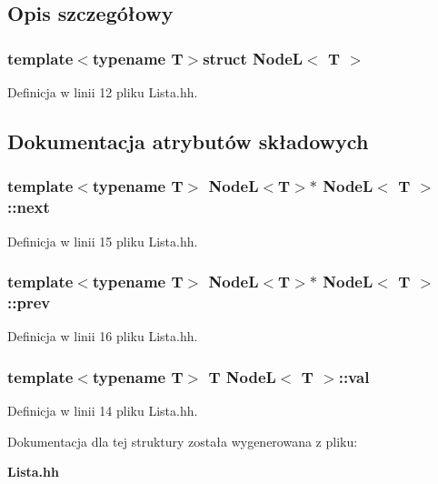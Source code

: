 \subsection{Opis szczegółowy}
\subsubsection*{template$<$typename T$>$struct Node\-L$<$ T $>$}



Definicja w linii 12 pliku Lista.\-hh.



\subsection{Dokumentacja atrybutów składowych}
\subsubsection[{next}]{\setlength{\rightskip}{0pt plus 5cm}template$<$typename T$>$ {\bf Node\-L}$<$T$>$$\ast$ {\bf Node\-L}$<$ T $>$\-::next}\label{struct_node_l_a0c3afc9e532c18b261ead8ee2218100d}


Definicja w linii 15 pliku Lista.\-hh.

\subsubsection[{prev}]{\setlength{\rightskip}{0pt plus 5cm}template$<$typename T$>$ {\bf Node\-L}$<$T$>$$\ast$ {\bf Node\-L}$<$ T $>$\-::prev}\label{struct_node_l_aae7a6ca0d9176d32f76164e8bf934372}


Definicja w linii 16 pliku Lista.\-hh.

\subsubsection[{val}]{\setlength{\rightskip}{0pt plus 5cm}template$<$typename T$>$ T {\bf Node\-L}$<$ T $>$\-::val}\label{struct_node_l_af8d6352b8a3b463d1a1f2dc9fa6378d6}


Definicja w linii 14 pliku Lista.\-hh.



Dokumentacja dla tej struktury została wygenerowana z pliku\-:\begin{DoxyCompactItemize}
\item 
{\bf Lista.\-hh}\end{DoxyCompactItemize}
